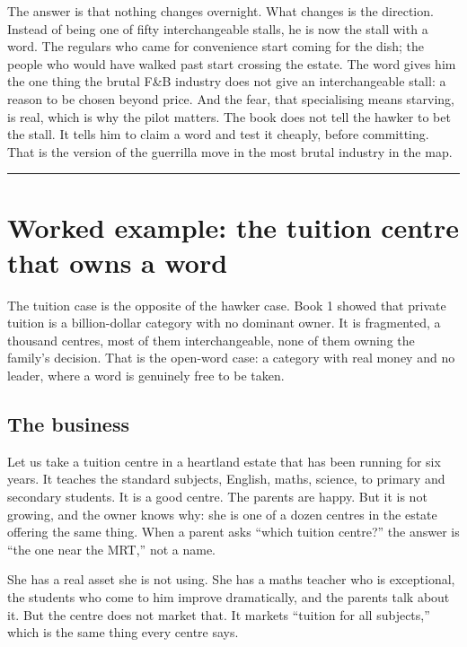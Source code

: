 \documentclass[10pt,twoside,openany]{memoir}
\newcommand{\needspacehead}{\needspace{4\baselineskip}}
\let\oldsection\section
\renewcommand{\section}{\needspacehead\oldsection}
\begin{document}
{The answer is that nothing changes overnight. What changes is the
direction. Instead of being one of fifty interchangeable stalls, he is
now the stall with a word. The regulars who came for convenience start
coming for the dish; the people who would have walked past start
crossing the estate. The word gives him the one thing the brutal F\&B
industry does not give an interchangeable stall: a reason to be chosen
beyond price. And the fear, that specialising means starving, is real,
which is why the pilot matters. The book does not tell the hawker to bet
the stall. It tells him to claim a word and test it cheaply, before
committing. That is the version of the guerrilla move in the most brutal
industry in the map.

\begin{center}\rule{0.5\linewidth}{0.5pt}\end{center}

\FloatBarrier
\chapter{Worked example: the tuition centre that owns a
word}\label{worked-example-the-tuition-centre-that-owns-a-word}

The tuition case is the opposite of the hawker case. Book 1 showed that
private tuition is a billion-dollar category with no dominant owner. It
is fragmented, a thousand centres, most of them interchangeable, none of
them owning the family's decision. That is the open-word case: a
category with real money and no leader, where a word is genuinely free
to be taken.

\section{The business}\label{the-business-2}

Let us take a tuition centre in a heartland estate that has been running
for six years. It teaches the standard subjects, English, maths,
science, to primary and secondary students. It is a good centre. The
parents are happy. But it is not growing, and the owner knows why: she
is one of a dozen centres in the estate offering the same thing. When a
parent asks ``which tuition centre?'' the answer is ``the one near the
MRT,'' not a name.

She has a real asset she is not using. She has a maths teacher who is
exceptional, the students who come to him improve dramatically, and the
parents talk about it. But the centre does not market that. It markets
``tuition for all subjects,'' which is the same thing every centre says.

}
\end{document}
